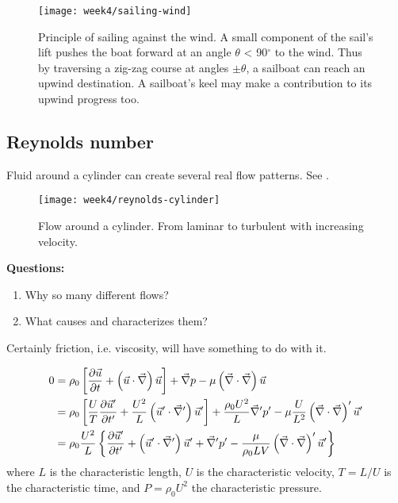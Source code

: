 \begin{figure}[!h]
    \centering
    \texttt{[image: week4/sailing-wind]}\\
    \caption{Principle of sailing against the wind. A small component of the sail’s lift pushes the boat forward at an angle $\theta$ < 90$^\circ$ to the wind. Thus by traversing a zig-zag course at angles $\pm\theta$, a sailboat can reach an upwind destination. A sailboat’s keel may make a contribution to its upwind progress too.}
    \label{fig:sailing-wind}
\end{figure}

\newpage
\subsection{Reynolds number}
Fluid around a cylinder can create several real flow patterns. See .

\begin{figure}[p]
    \centering
    \texttt{[image: week4/reynolds-cylinder]}\\
    \caption{Flow around a cylinder. From laminar to turbulent with increasing velocity.}
    \label{fig:reynolds-cylinder}
\end{figure}

\textbf{Questions:}
\begin{enumerate}
\item Why so many different flows?
\item What causes and characterizes them?
\end{enumerate}
Certainly friction, i.e. viscosity, will have something to do with it.

\begin{align}
0 &= \rho_0 \left[\frac{\partial \vec{u}}{\partial t}+\left(\vec{u}\cdot\vec{\nabla}\right)\vec{u}\right] + \vec{\nabla}p - \mu \left(\vec{\nabla}\cdot\vec{\nabla}\right) \vec{u} \\
&= \rho_0\left[\frac{U}{T}\frac{\partial \vec{u}'}{\partial t'}+\frac{U^2}{L}\left(\vec{u}'\cdot\vec{\nabla}'\right)\vec{u}'\right] + \frac{\rho_0 U^2}{L}\vec{\nabla}'p'-\mu\frac{U}{L^2}\left(\vec{\nabla}\cdot\vec{\nabla}\right)'\vec{u}' \\
&= \rho_0\frac{U^2}{L} \left\lbrace \frac{\partial \vec{u}'}{\partial t'}+\left(\vec{u}'\cdot\vec{\nabla}'\right)\vec{u}'+\vec{\nabla}'p'-\frac{\mu}{\rho_0 LV} \left(\vec{\nabla}\cdot\vec{\nabla}\right)'\vec{u}' \right\rbrace
\end{align}
where $L$ is the characteristic length, $U$ is the characteristic velocity, $T=L/U$ is the characteristic time, and $P=\rho_0U^2$ the characteristic pressure.

